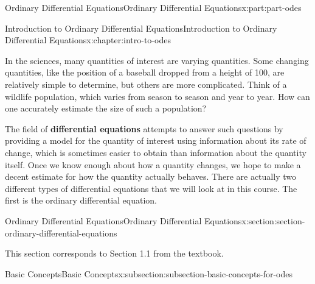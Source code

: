 \documentclass[oneside,10pt,]{book}
\newcommand{\terminology}[1]{\textbf{#1}}
\numberwithin{equation}{part}
\begin{document}
\raggedbottom
%
%
\typeout{************************************************}
\typeout{************************************************}
%
\begin{partptx}{Ordinary Differential Equations}{}{Ordinary Differential Equations}{}{}{x:part:part-odes}
%
\typeout{************************************************}
\typeout{************************************************}
%
\begin{chapterptx}{Introduction to Ordinary Differential Equations}{}{Introduction to Ordinary Differential Equations}{}{}{x:chapter:intro-to-odes}
\begin{introduction}{}%
In the sciences, many quantities of interest are varying quantities. Some changing quantities, like the position of a baseball dropped from a height of \SI{100}{\foot}, are relatively simple to determine, but others are more complicated. Think of a wildlife population, which varies from season to season and year to year. How can one accurately estimate the size of such a population?%
\par
The field of \terminology{differential equations} attempts to answer such questions by providing a model for the quantity of interest using information about its rate of change, which is sometimes easier to obtain than information about the quantity itself. Once we know enough about how a quantity changes, we hope to make a decent estimate for how the quantity actually behaves. There are actually two different types of differential equations that we will look at in this course. The first is the ordinary differential equation.%
\end{introduction}%
%
%
\typeout{************************************************}
\typeout{************************************************}
%
\begin{sectionptx}{Ordinary Differential Equations}{}{Ordinary Differential Equations}{}{}{x:section:section-ordinary-differential-equations}
\begin{introduction}{}%
This section corresponds to Section 1.1 from the textbook.%
\end{introduction}%
%
%
\typeout{************************************************}
\typeout{************************************************}
%
\begin{subsectionptx}{Basic Concepts}{}{Basic Concepts}{}{}{x:subsection:subsection-basic-concepts-for-odes}

\end{subsectionptx}
\end{sectionptx}
\end{chapterptx}
\end{partptx}
\end{document}
